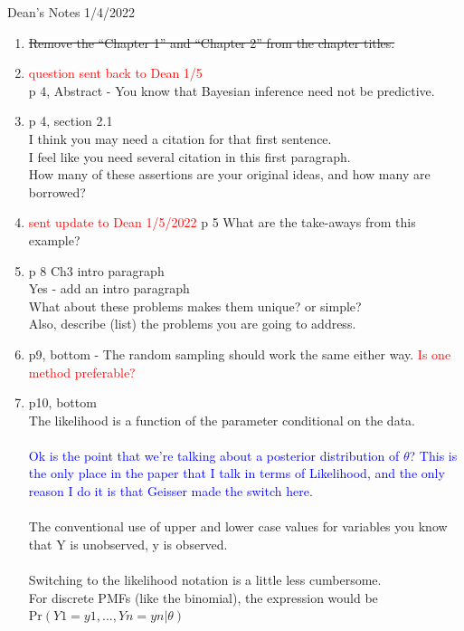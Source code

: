 \documentclass[12pt, a4paper]{article}
\begin{document}
{\huge Dean's Notes 1/4/2022}
\begin{enumerate}
  \item \sout{Remove the ``Chapter 1” and “Chapter 2” from the chapter titles.}
  \item \textcolor{red}{question sent back to Dean 1/5}\\
    p 4, Abstract - You know that Bayesian inference need not be predictive.
  \item p 4, section 2.1 \\
    I think you may need a citation for that first  sentence.\\
    I feel like you need several citation in this first paragraph.\\
    How many of these assertions are your original ideas, and how many are borrowed?\\

  \item \textcolor{red}{sent update to Dean 1/5/2022} p 5  What are the take-aways from this example?
  \item p 8 Ch3  intro paragraph\\
    Yes - add an intro paragraph\\
    What about these problems makes them unique? or simple?\\
    Also, describe (list) the problems you are going to address.\\
  \item p9, bottom - The random sampling should work the same either way.  \textcolor{red}{Is one method preferable?}
  \item p10, bottom \\
    The likelihood is a function of the parameter conditional on the data.\\\\

\textcolor{blue}{Ok is the point that we're talking about a posterior distribution of $\theta$?  This is the only place in the paper that I talk in terms of Likelihood, and the only reason I do it is that Geisser made the switch here.}\\\\

    The conventional use of upper and lower case values for variables you know that Y is unobserved, y is observed.\\\\

    Switching to the likelihood notation is a little less cumbersome.  \\
    For discrete PMFs (like the binomial), the expression would be\\
    Pr$(Y1 = y1,...,Yn=yn | \theta)$\\\\


\end{enumerate}
\end{document}
